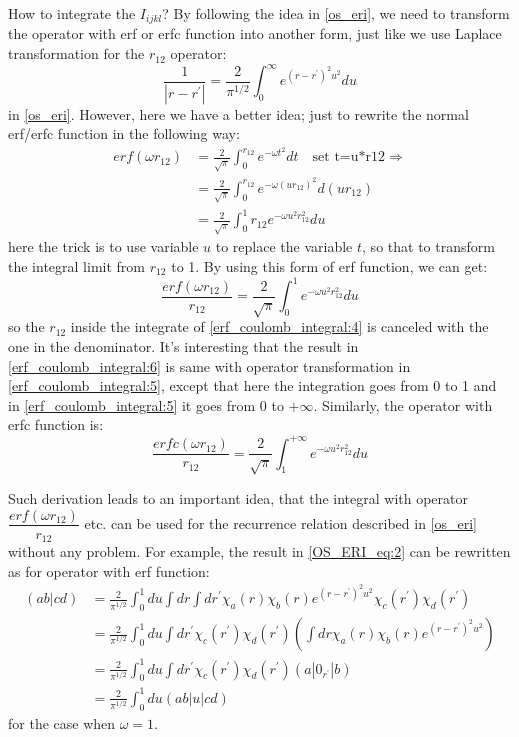 How to integrate the $I_{ijkl}$? By following the idea in \ref{os_eri}, we need to transform
the operator with erf or erfc function into another form, just like we use Laplace transformation
for the $r_{12}$ operator:
\begin{equation}\label{erf_coulomb_integral:5}
 \frac{1}{|r-r^{'}|} = \frac{2}{\pi^{1/2}}\int^{\infty}_{0}
e^{(r-r^{'})^{2}u^{2}}du
\end{equation}
in \ref{os_eri}. However, here we have a better idea; just to rewrite the normal erf/erfc function
in the following way:
\begin{align}\label{erf_coulomb_integral:4}
 erf(\omega r_{12})  
 &= \frac{2}{\sqrt{\pi}}\int_{0}^{r_{12}} e^{-\omega t^{2}} dt \quad \text{set t=u*r12}
 \Rightarrow \nonumber \\ 
 &= \frac{2}{\sqrt{\pi}}\int_{0}^{r_{12}} e^{-\omega (ur_{12})^{2}} d(ur_{12}) \nonumber \\
 &= \frac{2}{\sqrt{\pi}}\int_{0}^{1} r_{12}e^{-\omega u^{2}r_{12}^{2}} du 
\end{align}
here the trick is to use variable $u$ to replace the variable $t$, so that to transform the 
integral limit from $r_{12}$ to 1. By using this form of erf function, we can get:
\begin{equation}\label{erf_coulomb_integral:6}
 \frac{erf(\omega r_{12})}{r_{12}} = 
 \frac{2}{\sqrt{\pi}}\int_{0}^{1} e^{-\omega u^{2}r_{12}^{2}} du 
\end{equation}
so the $r_{12}$ inside the integrate of \ref{erf_coulomb_integral:4} is canceled with the 
one in the denominator. It's interesting that the result in \ref{erf_coulomb_integral:6}
is same with operator transformation in \ref{erf_coulomb_integral:5}, except that here
the integration goes from 0 to 1 and in \ref{erf_coulomb_integral:5} it goes from 0 to 
$+\infty$. Similarly, the operator with erfc function is:
\begin{equation}\label{erf_coulomb_integral:7}
 \frac{erfc(\omega r_{12})}{r_{12}} = 
 \frac{2}{\sqrt{\pi}}\int_{1}^{+\infty} e^{-\omega u^{2}r_{12}^{2}} du 
\end{equation}

Such derivation leads to an important idea, that the integral with operator 
$\dfrac{erf(\omega r_{12})}{r_{12}}$ etc. can be used for the recurrence relation described
in \ref{os_eri} without any problem. For example, the result in \ref{OS_ERI_eq:2}
can be rewritten as for operator with erf function:
\begin{equation}
 \begin{split}
 (ab|cd) &= \frac{2}{\pi^{1/2}}\int^{1}_{0} du 
\int dr \int dr^{'} \chi_{a}(r)\chi_{b}(r) e^{(r-r^{'})^{2}u^{2}}
\chi_{c}(r^{'})\chi_{d}(r^{'}) \\
&= \frac{2}{\pi^{1/2}}\int^{1}_{0} du
\int dr^{'}\chi_{c}(r^{'})\chi_{d}(r^{'}) 
\left( \int dr  \chi_{a}(r)\chi_{b}(r) e^{(r-r^{'})^{2}u^{2}}\right) \\ 
&= \frac{2}{\pi^{1/2}}\int^{1}_{0} du
\int dr^{'}\chi_{c}(r^{'})\chi_{d}(r^{'})(a|0_{r^{'}}|b) \\
&= \frac{2}{\pi^{1/2}}\int^{1}_{0} du (ab|u|cd)
 \end{split}
\end{equation}
for the case when $\omega = 1$.
